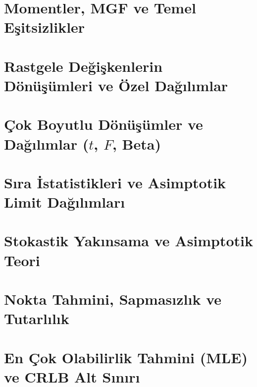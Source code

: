 \documentclass[11pt,a4paper,oneside]{book}
\begin{document}
\tableofcontents

\mainmatter

\renewcommand{\maketitle}{}
\newenvironment{abstract}{%
  \begin{tcolorbox}[
    enhanced,
    colback=secondaryblue!50,
    colframe=primaryblue!70,
    arc=2mm,
    boxrule=0.8pt,
    left=4mm, right=4mm, top=3mm, bottom=3mm
  ]
  \small\textbf{Haftal\i k Konu ve B\"{o}l\"{u}m \"{O}zeti:}\par\smallskip\ignorespaces
}{%
  \end{tcolorbox}\vspace{1em}%
}

\chapter{Momentler, MGF ve Temel E\c{s}itsizlikler}


\chapter{Rastgele De\u{g}i\c{s}kenlerin D\"{o}n\"{u}\c{s}\"{u}mleri ve \"{O}zel Da\u{g}\i l\i mlar}


\chapter{Çok Boyutlu D\"{o}n\"{u}\c{s}\"{u}mler ve Da\u{g}\i l\i mlar ($t$, $F$, Beta)}


\chapter{S\i ra \.{I}statistikleri ve Asimptotik Limit Da\u{g}\i l\i mlar\i}


\chapter{Stokastik Yak\i nsama ve Asimptotik Teori}


\chapter{Nokta Tahmini, Sapmas\i zl\i k ve Tutarl\i l\i k}


\chapter{En \c{C}ok Olabilirlik Tahmini (MLE) ve CRLB Alt S\i n\i r\i}

\end{document}
